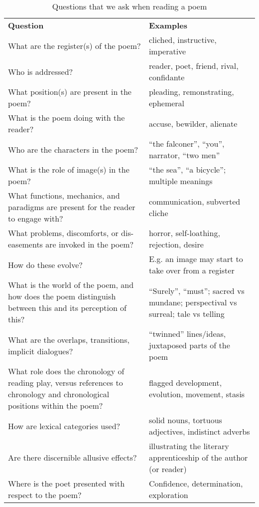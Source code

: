 \begin{table}[t!]
{\small
\def\arraystretch{1.2}
\begin{tabular}{p{1.8in}p{1.1in}}
\textbf{Question} & \textbf{Examples} \\[.1cm]
What are the register(s) of the poem? & cliched, instructive, imperative\\
Who is addressed? & reader, poet, friend, rival, confidante \\
What position(s) are present in the poem? & pleading, remonstrating, ephemeral\\
What is the poem doing with the reader? & accuse, bewilder, alienate\\
Who are the characters in the poem? & ``the falconer'', ``you'', narrator, ``two men'' \\
What is the role of image(s) in the poem? & ``the sea'', ``a bicycle''; multiple meanings\\
What functions, mechanics, and paradigms are present for the reader to engage with? & communication, subverted cliche\\
What problems, discomforts, or dis-easements are invoked in the poem? & horror, self-loathing, rejection, desire \\
How do these evolve? & E.g. an image may start to take over from a register \\
What is the world of the poem, and how does the poem distinguish between this and its perception of this? & ``Surely'', ``must''; sacred vs mundane; perspectival vs surreal; tale vs telling \\
What are the overlaps, transitions, implicit dialogues? & ``twinned'' lines/ideas, juxtaposed parts of the poem\\
What role does the chronology of reading play, versus references to chronology and chronological positions within the poem? & flagged development, evolution, movement, stasis\\
How are lexical categories used? & solid nouns, tortuous adjectives, indistinct adverbs \\
Are there discernible allusive effects? & illustrating the literary apprenticeship of the author (or reader)\\
Where is the poet presented with respect to the poem? & Confidence, determination, exploration\\
\end{tabular}
}

\caption{Questions that we ask when reading a poem\label{tab:questions_for_human_readers}}
\end{table}

